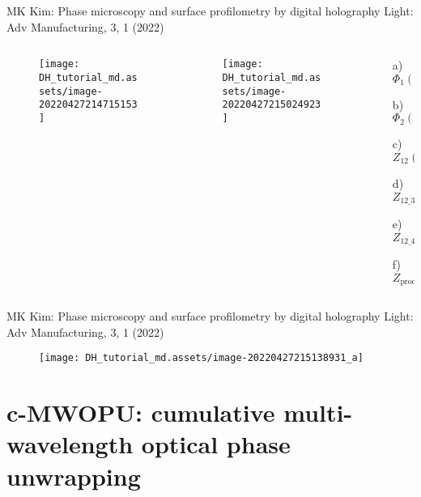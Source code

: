 \documentclass[t, aspectratio=169]{beamer}
\begin{document}
\begin{frame}{MK Kim: Phase microscopy and surface profilometry by digital holography}
	\vspace{-3 mm}
	\small Light: Adv Manufacturing, 3, 1 (2022)
	\begin{columns}
		\begin{column}{.47\textwidth}
			\begin{figure}
				\texttt{[image: DH\_tutorial\_md.assets/image-20220427214715153]}
			\end{figure}
		\end{column}
		\begin{column}{.28\textwidth}
			\begin{figure}
				\texttt{[image: DH\_tutorial\_md.assets/image-20220427215024923]}
			\end{figure}
		\end{column}
		\begin{column}{.25\textwidth}
			\begin{itemize}
				\item[a) ] $ \Phi_1(x,y) $
				\item[b) ] $ \Phi_2(x,y) $
				\item[c) ] $ Z_{12}(x,y) $
				\item[d) ] $ Z_{12\_3}(x,y) $
				\item[e) ] $ Z_{12\_4}(x,y) $
				\item[f) ] $ Z_{\textrm{proc}}(x,y) $
			\end{itemize}
		\end{column}
	\end{columns}
\end{frame}


\begin{frame}{MK Kim: Phase microscopy and surface profilometry by digital holography}
	\vspace{-3 mm}
	\small Light: Adv Manufacturing, 3, 1 (2022)
	\begin{figure}
		\texttt{[image: DH\_tutorial\_md.assets/image-20220427215138931\_a]}
	\end{figure}
\end{frame}


\section{c-MWOPU: cumulative multi-wavelength optical phase unwrapping}
\begin{frame}[c]
	\centering\LARGE\textbf{\secname}
\end{frame}
\end{document}
